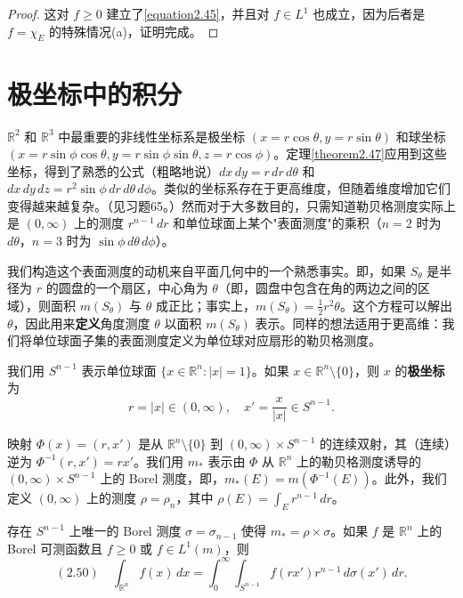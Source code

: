 \documentclass[lang=cn,10pt,thmcnt=section]{elegantbook}
\begin{document}
\begin{proof}
这对 $f \ge 0$ 建立了\eqref{equation2.45}，并且对 $f \in L^1$ 也成立，因为后者是 $f=\chi_E$ 的特殊情况(a)，证明完成。
\end{proof}

\section{极坐标中的积分}

$\mathbb{R}^2$ 和 $\mathbb{R}^3$ 中最重要的非线性坐标系是极坐标 $(x = r\cos\theta, y = r\sin\theta)$ 和球坐标 $(x = r\sin\phi\cos\theta, y = r\sin\phi\sin\theta, z = r\cos\phi)$。定理\ref{theorem2.47}应用到这些坐标，得到了熟悉的公式（粗略地说）$dx\,dy = r\,dr\,d\theta$ 和 $dx\,dy\,dz = r^2\sin\phi\,dr\,d\theta\,d\phi$。类似的坐标系存在于更高维度，但随着维度增加它们变得越来越复杂。（见习题65。）然而对于大多数目的，只需知道勒贝格测度实际上是 $(0,\infty)$ 上的测度 $r^{n-1}\,dr$ 和单位球面上某个"表面测度"的乘积（$n=2$ 时为 $d\theta$，$n=3$ 时为 $\sin\phi\,d\theta\,d\phi$）。


我们构造这个表面测度的动机来自平面几何中的一个熟悉事实。即，如果 $S_\theta$ 是半径为 $r$ 的圆盘的一个扇区，中心角为 $\theta$（即，圆盘中包含在角的两边之间的区域），则面积 $m(S_\theta)$ 与 $\theta$ 成正比；事实上，$m(S_\theta) = \frac{1}{2}r^2\theta$。这个方程可以解出 $\theta$，因此用来\textbf{定义}角度测度 $\theta$ 以面积 $m(S_\theta)$ 表示。同样的想法适用于更高维：我们将单位球面子集的表面测度定义为单位球对应扇形的勒贝格测度。

我们用 $S^{n-1}$ 表示单位球面 $\{x \in \mathbb{R}^n : |x| = 1\}$。如果 $x \in \mathbb{R}^n \setminus \{0\}$，则 $x$ 的\textbf{极坐标}为
\[r = |x| \in (0,\infty), \quad x' = \frac{x}{|x|} \in S^{n-1}.\]

映射 $\Phi(x) = (r, x')$ 是从 $\mathbb{R}^n \setminus \{0\}$ 到 $(0,\infty) \times S^{n-1}$ 的连续双射，其（连续）逆为 $\Phi^{-1}(r,x') = rx'$。我们用 $m_*$ 表示由 $\Phi$ 从 $\mathbb{R}^n$ 上的勒贝格测度诱导的 $(0,\infty) \times S^{n-1}$ 上的 Borel 测度，即，$m_*(E) = m(\Phi^{-1}(E))$。此外，我们定义 $(0,\infty)$ 上的测度 $\rho = \rho_n$，其中 $\rho(E) = \int_E r^{n-1}\,dr$。

\begin{theorem}\label{theorem2.49}
存在 $S^{n-1}$ 上唯一的 Borel 测度 $\sigma = \sigma_{n-1}$ 使得 $m_* = \rho \times \sigma$。如果 $f$ 是 $\mathbb{R}^n$ 上的 Borel 可测函数且 $f \geq 0$ 或 $f \in L^1(m)$，则
\[(2.50) \quad \int_{\mathbb{R}^n} f(x)\,dx = \int_0^\infty \int_{S^{n-1}} f(rx')r^{n-1}\,d\sigma(x')\,dr.\]
\end{theorem}
\end{document}
